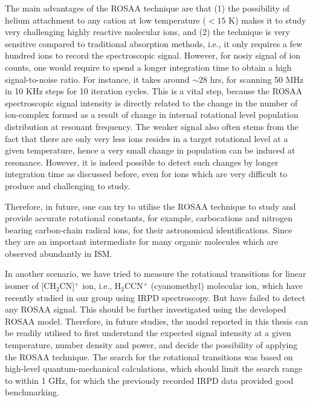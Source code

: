 The main advantages of the ROSAA technique are that (1) the possibility of helium attachment to any cation at 
low temperature ($< 15$ K) makes it to study very challenging highly reactive molecular ions, 
and (2) the technique is very sensitive compared to traditional absorption methods, 
i.e., it only requires a few hundred ions to record the spectroscopic signal.
However, for nosiy signal of ion counts, one would require to spend a longer integration time
to obtain a high signal-to-noise ratio. For instance, it takes around $\sim 28$ hrs, 
for scanning 50 MHz in 10 KHz steps for 10 iteration cycles. This is a vital step, because 
the ROSAA spectroscopic signal intensity is directly related to the change in the number of ion-complex 
formed as a result of change in internal rotational level population distribution at resonant frequency.
The weaker signal also often stems from the fact that there are only very less
ions resides in a target rotational level at a given temperature, hence a very small change 
in population can be induced at resonance. However, it is indeed possible to detect 
such changes by longer integration time as discussed before, even for ions which are very difficult 
to produce and challenging to study.

Therefore, in future, one can try to utilise the ROSAA technique to 
study and provide accurate rotational constants, for example, carbocations and 
nitrogen bearing carbon-chain radical ions, for their astronomical 
identifications. Since they are an important intermediate for many organic molecules 
which are observed abundantly in ISM.


In another scenario, we have tried to measure the rotational transitions for linear isomer of [CH$_2$CN]$^+$ ion, i.e., H$_2$CCN$^+$ (cyanomethyl) molecular ion, which have recently studied in our group using IRPD spectroscopy. But have failed to detect any ROSAA signal. This should be further investigated using the developed ROSAA model. Therefore, in future studies, the model reported in this thesis can be readily utilised to first understand the expected signal intensity at a given temperature, number density and power, and decide the possibility of applying the ROSAA technique. The search for the rotational transitions was based on high-level quantum-mechanical calculations, which should limit the search range to within 1 GHz, for which the previously recorded IRPD data provided good benchmarking.

